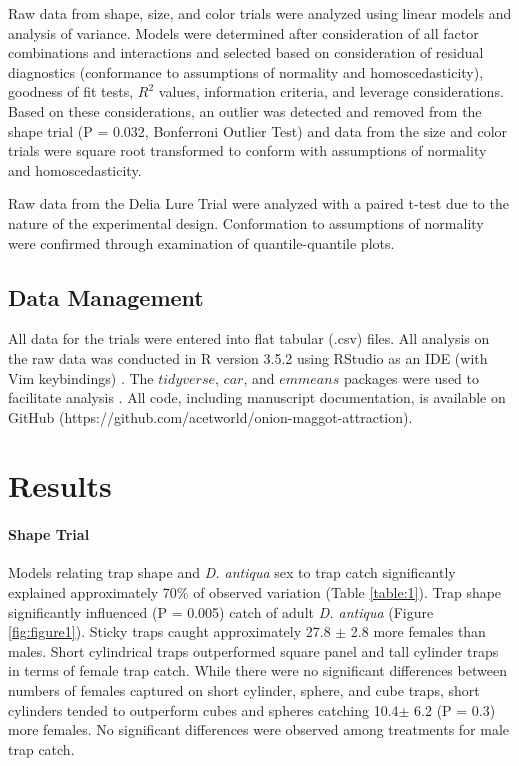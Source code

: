 \documentclass[alpha-refs]{wiley-article}
\begin{document}
Raw data from shape, size, and color trials were analyzed using linear models and analysis of variance.  Models were determined after consideration of all factor combinations and interactions and selected based on consideration of residual diagnostics (conformance to assumptions of normality and homoscedasticity), goodness of fit tests, $R^2$ values, information criteria, and leverage considerations. Based on these considerations, an outlier was detected and removed from the shape trial (P = 0.032, Bonferroni Outlier Test) and data from the size and color trials were square root transformed to conform with assumptions of normality and homoscedasticity.    

Raw data from the Delia Lure Trial were analyzed with a paired t-test due to the nature of the experimental design.  Conformation to assumptions of normality were confirmed through examination of quantile-quantile plots.

\subsection{Data Management}

All data for the trials were entered into flat tabular (.csv) files.  All analysis on the raw data was conducted in R version 3.5.2 using RStudio as an IDE (with Vim keybindings) \citep{rcore2018,rstudio}.  The $tidyverse$, $car$, and $emmeans$ packages were used to facilitate analysis \citep{tidy, car, emmeans}.  All code, including manuscript documentation, is available on GitHub (https://github.com/acetworld/onion-maggot-attraction).

\section{Results}


\paragraph{Shape Trial} Models relating trap shape and \textit{D. antiqua} sex to trap catch significantly explained approximately 70\% of observed variation (Table \ref{table:1}).  Trap shape significantly influenced (P = 0.005) catch of adult \textit{D. antiqua} (Figure \ref{fig:figure1}).  Sticky traps caught approximately 27.8 $\pm$ 2.8 more females than males.  Short cylindrical traps outperformed square panel and tall cylinder traps in terms of female trap catch.  While there were no significant differences between numbers of females captured on short cylinder, sphere, and cube traps, short cylinders tended to outperform cubes and spheres catching 10.4$\pm$ 6.2 (P = 0.3) more females.  No significant differences were observed among treatments for male trap catch.  
\end{document}
